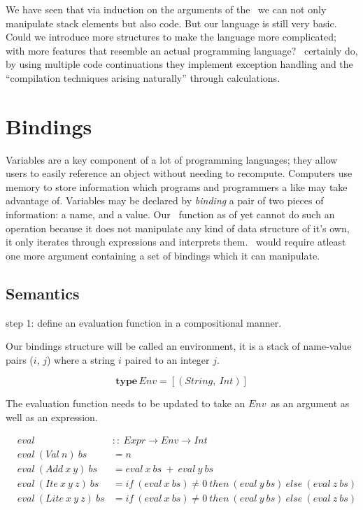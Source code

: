 \documentclass {article}
\begin{document}
We have seen that via 
induction on the arguments of the 
\vm\ we can not only manipulate
stack elements but also code.
But our language is still very
basic.
Could we introduce more structures
to make the language more complicated;
with more features that resemble
an actual programming language?
\BH\ certainly do, by using 
multiple code continuations they
implement exception handling and the
``compilation techniques arising naturally''
through calculations\cite[page 24]{bandh}.

\section{Bindings}

Variables are a key component
of a lot of programming languages;
they allow users to easily reference
an object without needing to recompute.
Computers use memory to store information
which programs and programmers a like may
take advantage of.
Variables may be declared by \emph{binding}
a pair of two pieces of information:
a name, and a value.
Our \eval\ function as of yet 
cannot do such an operation
because it does not manipulate any kind of
data structure of it's own,
it only iterates through
expressions and interprets them.
\eval\ would require atleast one more argument
containing a set of bindings which it can
manipulate.

\subsection{Semantics}

step 1: define an evaluation 
	function in a compositional manner.

Our bindings structure will be called
an environment, it is a stack
of name-value pairs ($i$, $j$) where
a string $i$ paired to an integer $j$.
\newcommand{\env}{$Env$}

	\[ \textbf{type} \, Env = [(String,\ Int)]\]

The evaluation function needs to be updated
to take an \env\ as an argument as well as
an expression.

\begin{eqnarray*}
	&eval              	   		&::\  Expr \rightarrow Env \rightarrow Int \\
	&eval\ (Val\ n)\ bs 		&=   n \\
	&eval\ (Add\ x\ y)\ bs		&=   eval\ x\ bs\ +\ eval\ y\ bs \\
	&eval\ (Ite\ x\ y\ z)\ bs	&=   if\ (eval\ x\ bs) \not= 0\ then\ (eval\ y\ bs)\ else\ (eval\ z\ bs) \\
	&eval\ (Lite\ x\ y\ z)\ bs 	&=   if\ (eval\ x\ bs) \not= 0\ then\ (eval\ y\ bs)\ else\ (eval\ z\ bs)
\end{eqnarray*}
	
\end{document}
